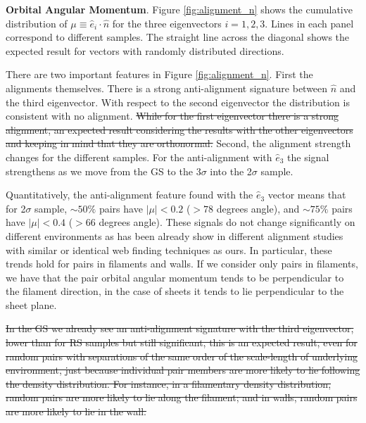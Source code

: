 \documentclass{emulateapj}
\providecommand{\DIFadd}[1]{{\protect\color{blue}\uwave{#1}}} %
\providecommand{\DIFdel}[1]{{\protect\color{red}\sout{#1}}}                      %
\providecommand{\DIFaddbegin}{} %
\providecommand{\DIFaddend}{} %
\providecommand{\DIFdelbegin}{} %
\providecommand{\DIFdelend}{} %
\begin{document}
{\bf Orbital Angular Momentum}. Figure \ref{fig:alignment_n} shows the
cumulative distribution of $\mu\equiv\hat{e}_i\cdot\hat{n}$  for the
three eigenvectors $i=1,2,3$.    
Lines in each panel correspond to different samples.
The straight line across the diagonal shows the expected
result for vectors with randomly distributed directions.


There are two important features in Figure \ref{fig:alignment_n}.
First the alignments themselves. 
There is a strong anti-alignment signature between $\hat{n}$ and the
third eigenvector. 
With respect to the \DIFaddbegin \DIFadd{first and }\DIFaddend second eigenvector the distribution is consistent
with no alignment. 
\DIFdelbegin \DIFdel{While for the first eigenvector there is a strong alignment, an expected
result considering the results with the other eigenvectors and
keeping in mind that they are orthonormal.
}\DIFdelend Second, the alignment strength changes for the different samples. 
For the anti-alignment with $\hat{e}_3$ the signal strengthens as we
move from the GS to the 3$\sigma$ into the 2$\sigma$ sample.

Quantitatively, the anti-alignment feature found with the $\hat{e}_3$ 
vector means that for 2$\sigma$ sample, $\sim 50\%$ pairs have
$|\mu|<0.2$ ($>78$ degrees angle), and $\sim 75\%$ pairs have $|\mu|<0.4$
($>66$ degrees angle). 
These signals do not change significantly on
different environments as has been already show in different alignment
studies with similar \citep{Libeskind2013} or identical
\citep{ForeroRomero2014} web finding techniques as ours.
In particular, these trends hold for pairs in filaments and walls.
If we consider only pairs in filaments, we have that the pair orbital
angular momentum tends to be perpendicular to the filament direction,
in the case of sheets it tends to lie perpendicular to the sheet plane.

\DIFdelbegin \DIFdel{In the GS we already see an anti-alignment signature with the third eigenvector,
lower than for RS samples but still significant, this is an expected result,
even for random pairs with separations of the same order of the scale-length of 
underlying environment, just because individual pair members are more likely to lie 
following the density distribution. For instance, in a filamentary density distribution, random 
pairs are more likely to lie along the filament; and in walls, random pairs are more likely
to lie in the wall.
}%
\end{document}
